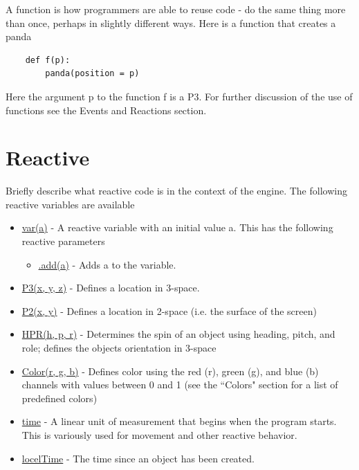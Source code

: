 \documentclass[10pt]{article}
\begin{document}
A function is how programmers are able to reuse code - do the same thing more than once, perhaps in slightly different ways.
Here is a function that creates a panda
\begin{lstlisting}
    def f(p):
        panda(position = p)
\end{lstlisting}
Here the argument p to the function f is a P3.
For further discussion of the use of functions see the Events and Reactions section.



\section*{Reactive}
Briefly describe what reactive code is in the context of the engine.
The following reactive variables are available
\begin{itemize}
    \item \underline{var(a)} - A reactive variable with an initial value a.
    This has the following reactive parameters
    \begin{itemize}
        \item \underline{.add(a)} - Adds a to the variable.
    \end{itemize}
    \item \underline{P3(x, y, z)} - Defines a location in 3-space.
    \item \underline{P2(x, y)} - Defines a location in 2-space (i.e. the surface of the screen)
    \item \underline{HPR(h, p, r)} - Determines the spin of an object using heading, pitch, and role; defines the objects orientation in 3-space
    \item \underline{Color(r, g, b)} - Defines color using the red (r), green (g), and blue (b) channels with values between 0 and 1 (see the ``Colors" section for a list of predefined colors)
    \item \underline{time} - A linear unit of measurement that begins when the program starts.
    This is variously used for movement and other reactive behavior.
    \item \underline{locelTime} - The time since an object has been created.
\end{itemize}
\end{document}
